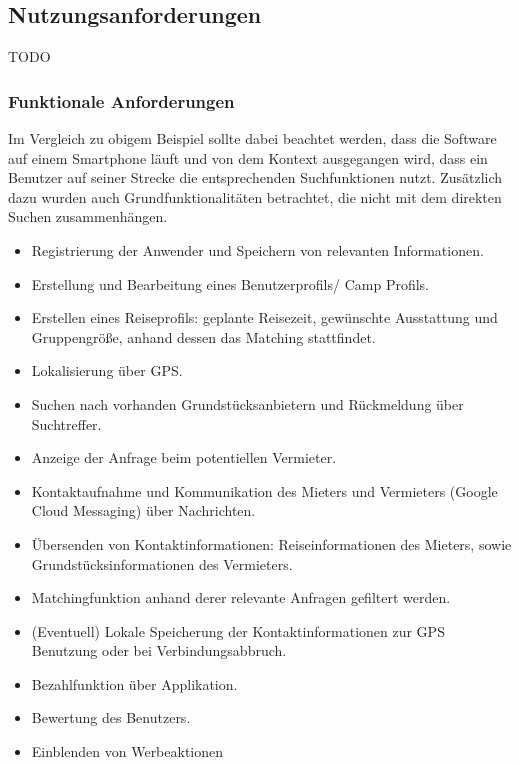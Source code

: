 
\subsection{Nutzungsanforderungen}
TODO

\subsubsection{Funktionale Anforderungen}        	
Im Vergleich zu obigem Beispiel sollte dabei beachtet werden, dass die Software auf einem Smartphone läuft und von dem Kontext ausgegangen wird, dass ein Benutzer auf seiner Strecke die entsprechenden Suchfunktionen nutzt. Zusätzlich dazu wurden auch Grundfunktionalitäten betrachtet, die nicht mit dem direkten Suchen zusammenhängen.

\begin{itemize}
   \item 
   Registrierung der Anwender und Speichern von relevanten Informationen.
   \item
   Erstellung und Bearbeitung eines Benutzerprofils/ Camp Profils.
   \item
   Erstellen eines Reiseprofils: geplante Reisezeit, gewünschte Ausstattung und Gruppengröße, anhand dessen das Matching stattfindet.
   \item
   Lokalisierung über GPS.
   \item 
   Suchen nach vorhanden Grundstücksanbietern und Rückmeldung über Suchtreffer.
   \item 
   Anzeige der Anfrage beim potentiellen Vermieter.
   \item
   Kontaktaufnahme und Kommunikation des Mieters und Vermieters (Google Cloud Messaging) über Nachrichten.
   \item
   Übersenden von Kontaktinformationen: Reiseinformationen des Mieters, sowie Grundstücksinformationen des Vermieters. 
   \item 
   Matchingfunktion anhand derer relevante Anfragen gefiltert werden.
   \item 
   (Eventuell) Lokale Speicherung der Kontaktinformationen zur GPS Benutzung oder bei Verbindungsabbruch.
   \item
   Bezahlfunktion über Applikation.
   \item
   Bewertung des Benutzers.
   \item
   Einblenden von Werbeaktionen

\end{itemize}

